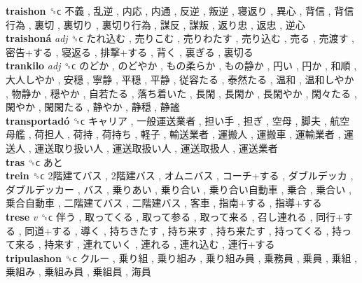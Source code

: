 \textbf{traishon} ␝ϲ   不義 ,  乱逆 ,  内応 ,  内通 ,  反逆 ,  叛逆 ,  寝返り ,  異心 ,  背信 ,  背信行為 ,  裏切 ,  裏切り ,  裏切り行為 ,  謀反 ,  謀叛 ,  返り忠 ,  返忠 ,  逆心   \\
\textbf{traishoná} \emph{adj}  ␝ϲ   たれ込む ,  売りこむ ,  売りわたす ,  売り込む ,  売る ,  売渡す ,  密告+する ,  寝返る ,  排撃+する ,  背く ,  裏ぎる ,  裏切る   \\
\textbf{trankilo} \emph{adj}  ␝ϲ   のどか ,  のどやか ,  もの柔らか ,  もの静か ,  円い ,  円か ,  和順 ,  大人しやか ,  安穏 ,  寧静 ,  平穏 ,  平静 ,  従容たる ,  泰然たる ,  温和 ,  温和しやか ,  物静か ,  穏やか ,  自若たる ,  落ち着いた ,  長閑 ,  長閑か ,  長閑やか ,  閑々たる ,  閑やか ,  閑閑たる ,  静やか ,  静穏 ,  静謐   \\
\textbf{transportadó} ␝ϲ   キャリア ,  一般運送業者 ,  担い手 ,  担ぎ ,  空母 ,  脚夫 ,  航空母艦 ,  荷担人 ,  荷持 ,  荷持ち ,  軽子 ,  輸送業者 ,  運搬人 ,  運搬車 ,  運輸業者 ,  運送人 ,  運送取り扱い人 ,  運送取扱い人 ,  運送取扱人 ,  運送業者   \\
\textbf{tras} ␝ϲ   あと   \\
\textbf{trein} ␝ϲ   2階建てバス ,  2階建バス ,  オムニバス ,  コーチ+する ,  ダブルデッカ ,  ダブルデッカー ,  バス ,  乗りあい ,  乗り合い ,  乗り合い自動車 ,  乗合 ,  乗合い ,  乗合自動車 ,  二階建てバス ,  二階建バス ,  客車 ,  指南+する ,  指導+する   \\
\textbf{trese} \emph{v}  ␝ϲ   伴う ,  取ってくる ,  取って参る ,  取って来る ,  召し連れる ,  同行+する ,  同道+する ,  導く ,  持ちきたす ,  持ち来す ,  持ち来たす ,  持ってくる ,  持って来る ,  持来す ,  連れていく ,  連れる ,  連れ込む ,  連行+する   \\
\textbf{tripulashon} ␝ϲ   クルー ,  乗り組 ,  乗り組み ,  乗り組み員 ,  乗務員 ,  乗員 ,  乗組 ,  乗組み ,  乗組み員 ,  乗組員 ,  海員   \\
